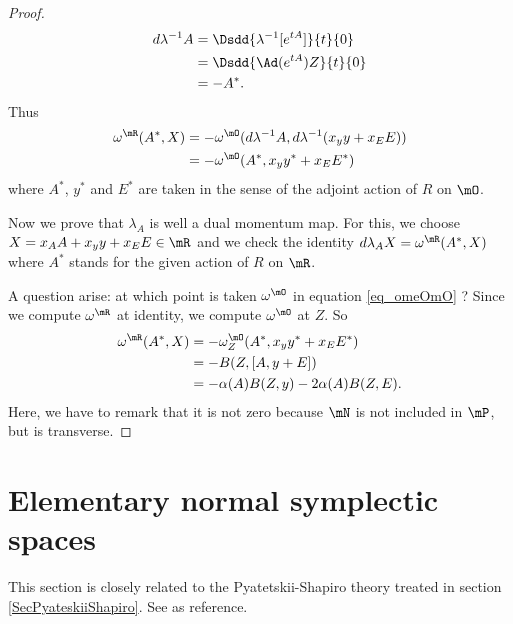 \begin{proof}
\[\begin{split}
d\lambda^{-1}A&=\Dsdd{ \lambda^{-1}[ e^{tA}] }{t}{0}\\
		&=\Dsdd{ \Ad( e^{tA})Z }{t}{0}\\
		&=-A^*.
\end{split}  
\]
Thus 
\begin{equation} \label{eq_omeOmO}
\begin{split}
\omega^{\mR}(A^*,X)&=-\omega^{\mO}(d\lambda^{-1}A,d\lambda^{-1}(x_yy+x_EE))\\
		&=-\omega^{\mO}(A^*,x_yy^*+x_EE^*)
\end{split}  
\end{equation}
where $A^*$, $y^*$ and $E^*$ are taken in the sense of the adjoint action of $R$ on $\mO$.

Now we prove that $\lambda_A$ is well a dual momentum map. For this, we choose $X=x_AA+x_yy+x_EE\in\mR$ and we check the identity $d\lambda_AX=\omega^{\mR}(A^*,X)$ where $A^*$ stands for the given action of $R$ on $\mR$.

A question arise: at which point is taken $\omega^{\mO}$ in equation \eqref{eq_omeOmO} ? Since we compute $\omega^{\mR}$ at identity, we compute $\omega^{\mO}$ at $Z$. So
 \[ 
\begin{split}
  \omega^{\mR}(A^*,X)&=-\omega^{\mO}_Z(A^*,x_yy^*+x_EE^*)\\
		&=-B(Z,[A,y+E])\\
		&=-\alpha(A)B(Z,y)-2\alpha(A)B(Z,E).
\end{split}  
\]
Here, we have to remark that it is not zero because $\mN$ is not included in $\mP$, but is transverse.

\end{proof}
\section{Elementary normal symplectic spaces}
\label{SecElemNormSymplSpace}

This section is closely related to the Pyatetskii-Shapiro theory treated in section \ref{SecPyateskiiShapiro}. See \cite{QuantifKhalerian} as reference.

